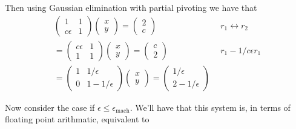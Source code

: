 \documentclass{article}
\begin{document}
Then using Gaussian elimination with partial pivoting we have that 
\begin{align*}
    \begin{pmatrix}
        1 & 1\\
        c\epsilon & 1
    \end{pmatrix}\begin{pmatrix}
        x\\y
    \end{pmatrix}=
    \begin{pmatrix}
        2\\c
    \end{pmatrix} & \ \ r_1 \leftrightarrow r_2\\
    = \begin{pmatrix}
        c\epsilon & 1\\
        1 & 1
    \end{pmatrix}\begin{pmatrix}
        x\\y
    \end{pmatrix}=
    \begin{pmatrix}
        c\\2
    \end{pmatrix} & \ \ r_1-1/c\epsilon r_1 \\
    =  \begin{pmatrix}
        1 & 1/\epsilon\\
        0&1-1/\epsilon
    \end{pmatrix}\begin{pmatrix}
        x\\y
    \end{pmatrix}=
    \begin{pmatrix}
        1/\epsilon\\
        2-1/\epsilon
    \end{pmatrix}
\end{align*}

Now consider the case if $\epsilon \leq \epsilon_{\text{mach}}$. We'll have that this system is, in terms of floating point arithmatic, equivalent to 
\end{document}
